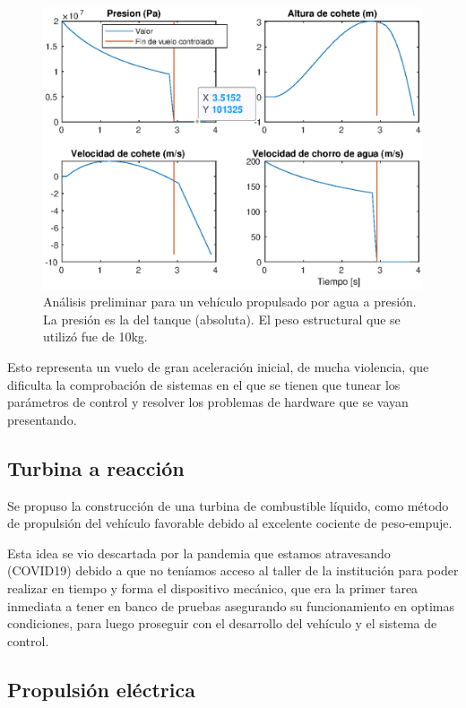 \begin{figure}[!ht]
    \centering
    \includegraphics[width=0.8\linewidth]{fig/bottlerocket}
    \caption{Análisis preliminar para un vehículo propulsado por agua a presión. La presión es la del tanque (absoluta). El peso estructural que se utilizó fue de 10kg.}
    \label{fig:bottlerocket}
\end{figure}

Esto representa un vuelo de gran aceleración inicial, de mucha violencia, que dificulta la comprobación de sistemas en el que se tienen que tunear los parámetros de control y resolver los problemas de hardware que se vayan presentando. 

\subsection{Turbina a reacción}\label{ssec:turbina}
Se propuso la construcción de una turbina de combustible líquido, como método de propulsión
del vehículo favorable debido al excelente cociente de peso-empuje.

Esta idea se vio descartada por la pandemia que estamos atravesando (COVID19) debido a que
no teníamos acceso al taller de la institución para poder realizar en tiempo y forma el
dispositivo mecánico, que era la primer tarea inmediata a tener en banco de pruebas
asegurando su funcionamiento en optimas condiciones, para luego proseguir con el desarrollo
del vehículo y el sistema de control.


\subsection{Propulsión eléctrica}\label{ssec:propelectrica}


